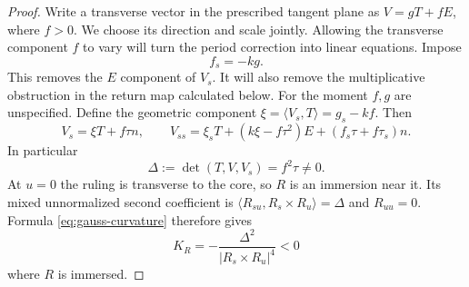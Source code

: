 \documentclass[11pt]{amsart}
\theoremstyle{definition}
\begin{document}
\begin{proof}
Write a transverse vector in the prescribed tangent plane as
$V=gT+fE$, where $f>0$. We choose its direction and scale
jointly. Allowing the transverse component $f$ to vary will turn
the period correction into linear equations. Impose
\begin{equation}\label{eq:ruling-constraint}
 f_s=-kg.
\end{equation}
This removes the $E$ component of $V_s$. It will also remove
the multiplicative obstruction in the return map calculated below.
For the moment $f,g$ are unspecified. Define the geometric component
$\xi=\langle V_s,T\rangle=g_s-kf$. Then
\[
 V_s=\xi T+f\tau n,\qquad
 V_{ss}=\xi_sT+(k\xi-f\tau^2)E+(f_s\tau+f\tau_s)n.
\]
In particular
\begin{equation}\label{eq:delta}
 \Delta:=\det(T,V,V_s)=f^2\tau\ne0.
\end{equation}
At $u=0$ the ruling is transverse to the core, so $R$ is an
immersion near it. Its mixed unnormalized second coefficient is
$\langle R_{su},R_s\times R_u\rangle=\Delta$ and $R_{uu}=0$.
Formula \eqref{eq:gauss-curvature} therefore gives
\begin{equation}\label{eq:ruled-curvature}
 K_R=-\frac{\Delta^2}{|R_s\times R_u|^4}<0
\end{equation}
where $R$ is immersed.


\end{proof}
\end{document}
